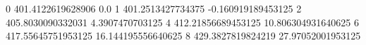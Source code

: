 0 401.4122619628906 0.0
1 401.2513427734375 -0.160919189453125
2 405.8030090332031 4.3907470703125
4 412.21856689453125 10.806304931640625
6 417.55645751953125 16.144195556640625
8 429.3827819824219 27.97052001953125
